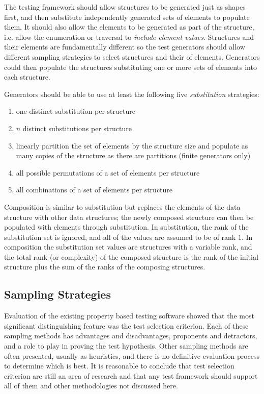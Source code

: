 The testing framework should allow 
structures to be generated just as shapes first,
and then substitute independently generated sets of elements to populate them.
It should also allow the elements to be generated as 
part of the structure, i.e. allow the enumeration or traversal to \emph{include element values}.
Structures and their elements are fundamentally different
so the test generators should allow different sampling strategies 
to select structures and their of elements.
Generators could then populate the structures substituting 
one or more sets of elements into each structure.

Generators should be able to use at least the following five \emph{substitution} strategies:

\begin{enumerate}
\item one distinct substitution per structure
\item $n$ distinct substitutions per structure
\item linearly partition the set of elements by the structure size
and populate as many copies of the structure as there are partitions (finite generators only)
\item all  possible permutations of a set of elements per structure
\item all combinations of a set of elements per structure
\end{enumerate}

Composition is similar to substitution but replaces the elements of the data structure
with other data structures; the newly composed structure can then 
be populated with elements through substitution.
In substitution, the rank of the substitution set is ignored,
and all of the values are assumed to be of rank 1.
In composition the substitution set values are structures with a variable rank,
and the total rank (or complexity) of the composed structure
is the rank of the initial structure plus the sum of the ranks of the composing structures.



\subsection{Sampling Strategies}

Evaluation of the existing property based testing software showed that 
the most significant distinguishing feature was the test selection criterion.
Each of these sampling methods has advantages and disadvantages,
proponents and detractors, and a role to play in proving the test hypothesis.
Other sampling methods are often presented, usually as heuristics,
and there is no definitive evaluation process to determine which is best.
It is reasonable to conclude that test selection criterion are still
an area of research and that any test framework should support
all of them and other methodologies not discussed here.

